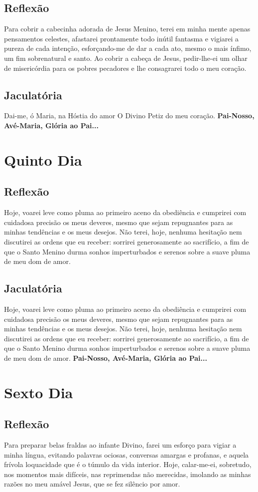 \documentclass[11pt]{article}
\begin{document}
\subsection{Reflexão}
Para cobrir a cabecinha adorada de Jesus Menino, terei em minha mente apenas pensamentos celestes, afastarei prontamente todo inútil fantasma e vigiarei a pureza de cada intenção, esforçando-me de dar a cada ato, mesmo o mais ínfimo, um fim sobrenatural e santo. Ao cobrir a cabeça de Jesus, pedir-lhe-ei um olhar de misericórdia para os pobres pecadores e lhe consagrarei todo o meu coração.
\subsection{Jaculatória}
Dai-me, ó Maria, na Hóstia do amor
O Divino Petiz do meu coração.
\textbf{Pai-Nosso, Avé-Maria, Glória ao Pai... }

\section{Quinto Dia}
\subsection{Reflexão}
Hoje, voarei leve como pluma ao primeiro aceno da obediência e cumprirei com cuidadosa precisão os meus deveres, mesmo que sejam repugnantes para as minhas tendências e os meus desejos. Não terei, hoje, nenhuma hesitação nem discutirei as ordens que eu receber: sorrirei generosamente ao sacrifício, a fim de que o Santo Menino durma sonhos imperturbados e serenos sobre a suave pluma de meu dom de amor.
\subsection{Jaculatória}
Hoje, voarei leve como pluma ao primeiro aceno da obediência e cumprirei com cuidadosa precisão os meus deveres, mesmo que sejam repugnantes para as minhas tendências e os meus desejos. Não terei, hoje, nenhuma hesitação nem discutirei as ordens que eu receber: sorrirei generosamente ao sacrifício, a fim de que o Santo Menino durma sonhos imperturbados e serenos sobre a suave pluma de meu dom de amor.
\textbf{Pai-Nosso, Avé-Maria, Glória ao Pai... }

\section{Sexto Dia}
\subsection{Reflexão}
Para preparar belas fraldas ao infante Divino, farei um esforço para vigiar a minha língua, evitando palavras ociosas, conversas amargas e profanas, e aquela frívola loquacidade que é o túmulo da vida interior. Hoje, calar-me-ei, sobretudo, nos momentos mais difíceis, nas reprimendas não merecidas, imolando as minhas razões no meu amável Jesus, que se fez silêncio por amor.
\end{document}
